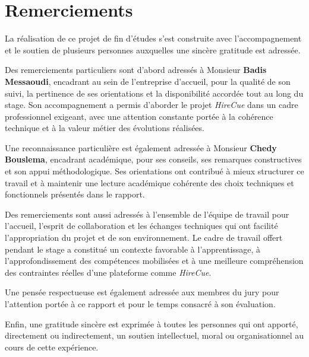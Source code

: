 \chapter*{Remerciements}

La r\'ealisation de ce projet de fin d'\'etudes s'est construite avec l'accompagnement et le soutien de plusieurs personnes auxquelles une sinc\`ere gratitude est adress\'ee.

Des remerciements particuliers sont d'abord adress\'es \`a Monsieur \textbf{Badis Messaoudi}, encadrant au sein de l'entreprise d'accueil, pour la qualité de son suivi, la pertinence de ses orientations et la disponibilité accordée tout au long du stage. Son accompagnement a permis d'aborder le projet \textit{HireCue} dans un cadre professionnel exigeant, avec une attention constante portée à la cohérence technique et à la valeur métier des évolutions réalisées.

Une reconnaissance particuli\`ere est également adressée \`a Monsieur \textbf{Chedy Bouslema}, encadrant académique, pour ses conseils, ses remarques constructives et son appui méthodologique. Ses orientations ont contribué à mieux structurer ce travail et à maintenir une lecture académique cohérente des choix techniques et fonctionnels présentés dans le rapport.

Des remerciements sont aussi adress\'es \`a l'ensemble de l'\'equipe de travail pour l'accueil, l'esprit de collaboration et les \'echanges techniques qui ont facilit\'e l'appropriation du projet et de son environnement. Le cadre de travail offert pendant le stage a constitu\'e un contexte favorable \`a l'apprentissage, \`a l'approfondissement des comp\'etences mobilis\'ees et \`a une meilleure compr\'ehension des contraintes r\'eelles d'une plateforme comme \textit{HireCue}.

Une pens\'ee respectueuse est \'egalement adress\'ee aux membres du jury pour l'attention port\'ee \`a ce rapport et pour le temps consacr\'e \`a son \'evaluation.

Enfin, une gratitude sinc\`ere est exprim\'ee \`a toutes les personnes qui ont apport\'e, directement ou indirectement, un soutien intellectuel, moral ou organisationnel au cours de cette exp\'erience.
